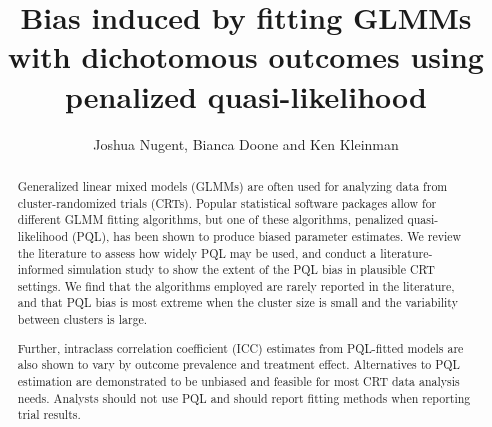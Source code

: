 \documentclass[Afour,times,sagev,doublespace]{sagej}
\begin{document}

\title{Bias induced by fitting GLMMs with dichotomous outcomes using penalized quasi-likelihood}

\author{Joshua Nugent, Bianca Doone and Ken Kleinman}





\begin{abstract}
Generalized linear mixed models (GLMMs) are often used for analyzing data from cluster-randomized trials (CRTs). Popular statistical software packages allow for different GLMM fitting algorithms, but one of these algorithms, penalized quasi-likelihood (PQL), has been shown to produce biased parameter estimates. We review the literature to assess how widely PQL may be used, and conduct a literature-informed simulation study to show the extent of the PQL bias in plausible CRT settings. We find that the algorithms employed are rarely reported in the literature, and that PQL bias is most extreme when the cluster size is small and the variability between clusters is large.

Further, intraclass correlation coefficient (ICC) estimates from PQL-fitted models are also shown to vary by outcome prevalence and treatment effect. Alternatives to PQL estimation are demonstrated to be unbiased and feasible for most CRT data analysis needs.  Analysts should not use PQL and should report fitting methods when reporting trial results.
\end{abstract}


\maketitle
\end{document}
